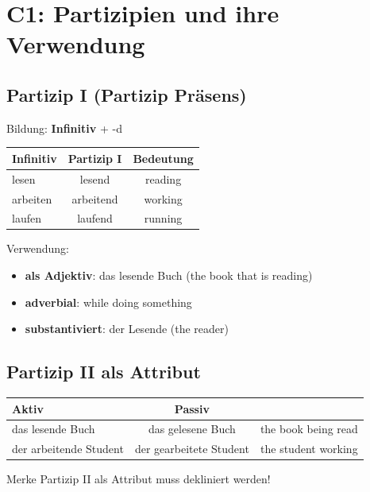 \chapter{C1: Partizipien und ihre Verwendung}
\label{cha:C1Partizipien}

\section{Partizip I (Partizip Präsens)}
\label{sec:C1PartizipI}

Bildung: \textbf{Infinitiv} + -d

\begin{center}
\begin{tabular}{|l|c|c|}
\hline
Infinitiv & Partizip I & Bedeutung \\ \hline
lesen & lesend & reading \\ \hline
arbeiten & arbeitend & working \\ \hline
laufen & laufend & running \\ \hline
\end{tabular}
\end{center}

Verwendung:
\begin{itemize}
    \item \textbf{als Adjektiv}: das lesende Buch (the book that is reading)
    \item \textbf{adverbial}: while doing something
    \item \textbf{substantiviert}: der Lesende (the reader)
\end{itemize}

\section{Partizip II als Attribut}
\label{sec:C1PartizipIIAttr}

\begin{center}
\begin{tabular}{|l|c|c|}
\hline
Aktiv & Passiv & \\ \hline
das lesende Buch & das gelesene Buch & the book being read \\ \hline
der arbeitende Student & der gearbeitete Student & the student working \\ \hline
\end{tabular}
\end{center}

\begin{tippbox}{Merke}
Partizip II als Attribut muss dekliniert werden!
\end{tippbox}

